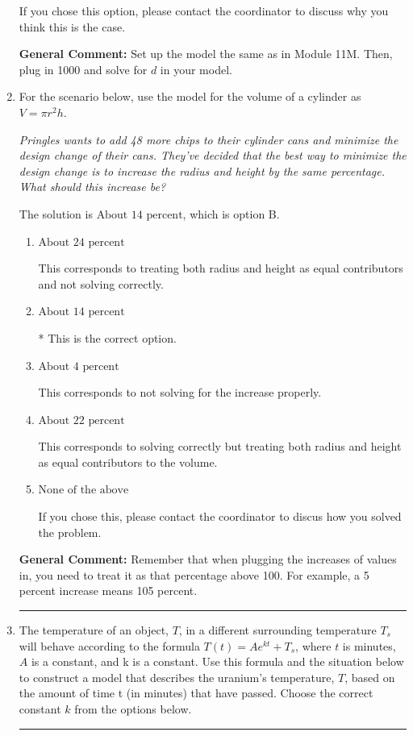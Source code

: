 \documentclass{extbook}[14pt]
\newcommand{\litem}[1]{\item #1

\rule{\textwidth}{0.4pt}}
\begin{document}
\begin{enumerate}
{\begin{enumerate}[label=\Alph*.]
If you chose this option, please contact the coordinator to discuss why you think this is the case.
\end{enumerate}

\textbf{General Comment:} Set up the model the same as in Module 11M. Then, plug in 1000 and solve for $d$ in your model.
}
\litem{
For the scenario below, use the model for the volume of a cylinder as $V = \pi r^2 h$.

\begin{center}
    \textit{ Pringles wants to add 48 \text{percent} more chips to their cylinder cans and minimize the design change of their cans. They've decided that the best way to minimize the design change is to increase the radius and height by the same percentage. What should this increase be? }
\end{center}


The solution is \( \text{About } 14 \text{ percent} \), which is option B.\begin{enumerate}[label=\Alph*.]
\item \( \text{About } 24 \text{ percent} \)

This corresponds to treating both radius and height as equal contributors and not solving correctly.
\item \( \text{About } 14 \text{ percent} \)

* This is the correct option.
\item \( \text{About } 4 \text{ percent} \)

This corresponds to not solving for the increase properly.
\item \( \text{About } 22 \text{ percent} \)

This corresponds to solving correctly but treating both radius and height as equal contributors to the volume.
\item \( \text{None of the above} \)

If you chose this, please contact the coordinator to discus how you solved the problem.
\end{enumerate}

\textbf{General Comment:} Remember that when plugging the increases of values in, you need to treat it as that percentage above 100. For example, a 5 percent increase means 105 percent.
}
\litem{
The temperature of an object, $T$, in a different surrounding temperature $T_s$ will behave according to the formula $T(t) = Ae^{kt} + T_s$, where $t$ is minutes, $A$ is a constant, and k is a constant. Use this formula and the situation below to construct a model that describes the uranium's temperature, $T$, based on the amount of time t (in minutes) that have passed. Choose the correct constant $k$ from the options below.

}
\end{enumerate}
\end{document}

